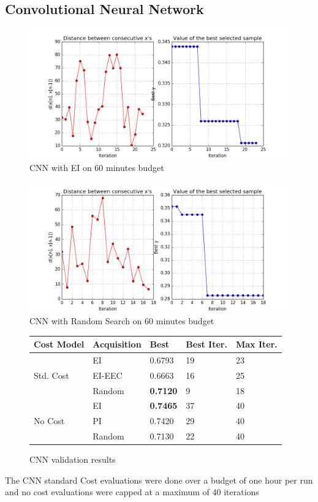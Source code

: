 \documentclass[letterpaper]{article}
\begin{document}
\subsection {Convolutional Neural Network}
\begin{figure}[!h]
	\includegraphics[width=\linewidth]{EIX_CNN_X_init2_STD_ITER60min_v2.png}
	\caption{CNN with EI on 60 minutes budget}
\end{figure}
\begin{figure}[!h]
	\includegraphics[width=\linewidth]{RAND_CNN_X_init2_STD_ITER60min_v2.png}
	\caption{CNN with Random Search on 60 minutes budget}
\end{figure}
\begin{figure}[!h]
\begin{center}
	\begin{tabular}{lllll}
		\hline
		Cost Model & Acquisition & Best & Best Iter. & Max Iter.\\
		\hline
		\multirow{3}{*}{Std. Cost} & EI &  0.6793 & 19 & 23\\
		& EI-EEC & 0.6663 & 16 & 25\\
		& Random & \textbf{0.7120} & 9 & 18\\
		\hline
		\multirow{4}{*}{No Cost} & EI & \textbf{0.7465} & 37 & 40\\
		& PI & 0.7420 & 29 & 40\\
		& Random & 0.7130 & 22 & 40\\
		\hline
	\end{tabular}
\end{center}
	\caption{CNN validation results}
\end{figure}
The CNN standard Cost evaluations were done over a budget of one hour per run and no cost evaluations were capped at a maximum of 40 iterations
\end{document}
